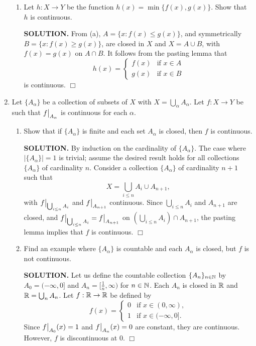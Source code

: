 \documentclass{article}
\begin{document}
\begin{enumerate}
\begin{enumerate}
        \item Let $h: X \rightarrow Y$ be the function $h(x) = \min\{f(x), g(x)\}$. Show that $h$ is continuous.

        {\bf SOLUTION.} From (a), $A = \{x: f(x) \leq g(x)\}$, and symmetrically $B = \{x: f(x) \geq g(x)\}$, are closed in $X$ and $X = A \cup B$, with $f(x) = g(x)$ on $A \cap B$. It follows from the pasting lemma that 
        $$h(x) = \begin{cases}
            f(x) &\text{if } x \in A \\
            g(x) &\text{if } x \in B
        \end{cases}$$
        is continuous. $\Box$
    \end{enumerate}

    \item Let $\{A_\alpha\}$ be a collection of subsets of $X$ with $X = \bigcup_\alpha A_\alpha$. Let $f:X\rightarrow Y$ be such that $\restr{f}{A_\alpha}$ is continuous for each $\alpha$.
    \begin{enumerate}
        \item Show that if $\{A_\alpha\}$ is finite and each set $A_\alpha$ is closed, then $f$ is continuous.

    {\bf SOLUTION.} By induction on the cardinality of $\{A_\alpha\}$. The case where $|\{A_\alpha\}| = 1$ is trivial; assume the desired result holds for all collections $\{A_\alpha\}$ of cardinality $n$. Consider a collection $\{A_\alpha\}$ of cardinality $n+1$ such that 
    $$X = \bigcup_{i \leq n} A_i \cup A_{n+1},$$
    with $\restr{f}{\bigcup_{i \leq n} A_i}$ and $\restr{f}{A_{n+1}}$ continuous. Since $\bigcup_{i \leq n} A_i$ and $A_{n+1}$ are closed, and $\restr{f}{\bigcup_{i \leq n} A_i} = \restr{f}{A_{n+1}}$ on $\left(\bigcup_{i \leq n} A_i\right) \cap A_{n+1}$, the pasting lemma implies that $f$ is continuous. $\Box$
    
    \item Find an example where $\{A_\alpha\}$ is countable and each $A_\alpha$ is closed, but $f$ is not continuous.

    {\bf SOLUTION.} Let us define the countable collection $\{A_n\}_{n \in \mathbb{N}}$ by $A_0 = (-\infty, 0]$ and $A_n = [\frac1n, \infty)$ for $n \in \mathbb{N}$. Each $A_n$ is closed in $\mathbb{R}$ and $\mathbb{R} = \bigcup_n A_n$. Let $f: \mathbb{R} \rightarrow \mathbb{R}$ be defined by
    $$f(x) = \begin{cases}
        0 &\text{if } x \in (0, \infty), \\
        1 &\text{if } x \in (-\infty, 0].
    \end{cases}$$
    Since $\restr{f}{A_0}(x) = 1$ and $\restr{f}{A_n}(x) = 0$ are constant, they are continuous. However, $f$ is discontinuous at $0$. $\Box$


\end{enumerate}
\end{enumerate}
\end{document}
